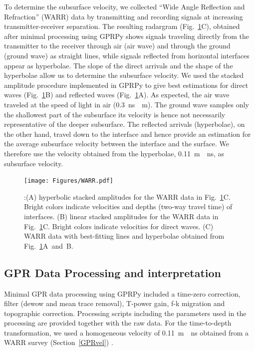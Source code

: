 \documentclass[utf8]{frontiersSCNS}
\begin{document}
To determine the subsurface velocity, we collected ``Wide Angle Reflection and Refraction'' (WARR) data by transmitting and recording signals at increasing transmitter-receiver separation. The resulting radargram (Fig.~\ref{WARR}C), obtained after minimal processing using GPRPy \citep{plattner2019comunity,plattner2020GPRPy} shows signals traveling directly from the transmitter to the receiver through air (air wave) and through the ground (ground wave) as straight lines, while signals reflected from horizontal interfaces appear as hyperbolae. The slope of the direct arrivals and the shape of the hyperbolae allow us to determine the subsurface velocity. We used the stacked amplitude procedure implemented in GPRPy to give best estimations for direct waves (Fig.~\ref{WARR}B) and reflected waves (Fig.~\ref{WARR}A). As expected, the air wave traveled at the speed of light in air (\SI{0.3}{ns \per m}). The ground wave samples only the shallowest part of the subsurface its velocity is hence not necessarily representative of the deeper subsurface. The reflected arrivals (hyperbolae), on the other hand, travel down to the interface and hence provide an estimation for the average subsurface velocity between the interface and the surface. We therefore use the velocity obtained from the hyperbolae, \SI{0.11}{m \per ns}, as subsurface velocity.



	                                 \begin{figure}

	\texttt{[image: Figures/WARR.pdf]}
		\caption{:(A) hyperbolic stacked amplitudes for the WARR data in Fig.~\ref{WARR}C. Bright colors indicate velocities and depths (two-way travel time) of interfaces. (B) linear stacked amplitudes for the WARR data in Fig.~\ref{WARR}C. Bright colors indicate velocities for direct waves. (C) WARR data with best-fitting lines and hyperbolae obtained from Fig.~\ref{WARR}A~and~B.\label{WARR}}
		
		                        	   \end{figure}



\subsection{GPR Data Processing and interpretation}

Minimal GPR data processing using GPRPy \citep{plattner2019comunity,plattner2020GPRPy} included a time-zero correction, filter (dewow and mean trace removal), T-power gain, f-k migration \citep{stolt1978migration} and topographic correction. Processing scripts including the parameters used in the processing are provided together with the raw data. For the time-to-depth transformation, we used a homogeneous velocity of \SI{0.11}{m \per ns} obtained from a WARR survey (Section~\ref{GPRvel}) \citep{annan1976impulse, davis1989ground}. 
\end{document}

